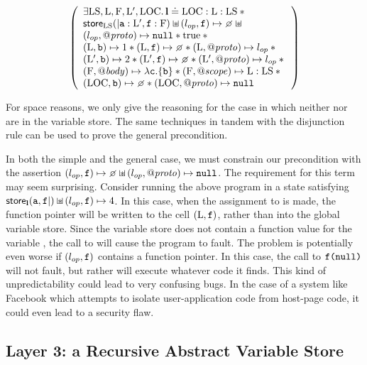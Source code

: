 \documentclass{article}
\begin{document}
\[\left(\begin{array}{l}
                \exists\V{LS},\V{L},\V{F},\V{L}',\V{LOC}\st\ls\doteq\V{LOC}:\V{L}:\V{LS} \sep {} \\
                \store_{\V{LS}}(|\js{a}:\V{L}',\js{f}:\V{F})\sepish(\lop,\js{f})\pointsto\none\sepish{}\\(\lop,\protop)\pointsto\nil \sep \true \sep {}\\
                (\V{L},\js{b})\pointsto 1 \sep (\V{L},\js{f})\pointsto\none \sep (\V{L},\protop)\pointsto\lop \sep {}\\
                (\V{L}',\js{b})\pointsto 2 \sep (\V{L}',\js{f})\pointsto\none \sep (\V{L}',\protop)\pointsto\lop \sep {}\\
                (\V{F},\bodyp)\pointsto \lambda\js{c}.\{\js{b}\} \sep
                (\V{F},\fscopep)\pointsto \V{L}:\V{LS} \sep {} \\
                (\V{LOC},\js{b})\pointsto\none \sep (\V{LOC},\protop)\pointsto\nil
        \end{array}\right)\]



For space reasons, we only give the reasoning for  the case in which neither 
nor  are in the variable store. The same techniques in tandem with the
disjunction rule can be used to prove the general precondition.


In both the simple and the general case, we must constrain our precondition with
the assertion $(\lop,\js{f})\pointsto\none\sepish(\lop,\protop)\pointsto\nil$. The requirement for this term may seem
surprising. 
Consider running the above program in a state satisfying $\mathsf{store}_{\textbf{l}}(\mbox{\texttt{{\upshape a}}},\mbox{\texttt{{\upshape f}}}|) \mathbin{\sqcup\mkern-10mu*}(l_{op},\mbox{\texttt{{\upshape f}}})\mapsto 4$.
In this case, when the assignment to  is made, the function pointer will be written to the cell $({\mathrm{L}},\mbox{\texttt{{\upshape f}}})$, rather than into the global variable store. Since the variable store does not contain a function value for the variable , the call to  will cause the program to fault.
The problem is potentially even worse  if $(l_{op},\mbox{\texttt{{\upshape f}}})$ contains a function pointer.
In this case, the call to $\mbox{\texttt{{\upshape f(null)}}}$ will not fault, but rather will execute
whatever code it finds. This kind of unpredictability
could lead to very confusing bugs. In the case of a system like Facebook
which attempts to isolate user-application code from host-page code, 
it could even lead to a security flaw.




\subsection{Layer 3: a Recursive Abstract Variable Store}
\label{sec:examples:recstore}
\end{document}
